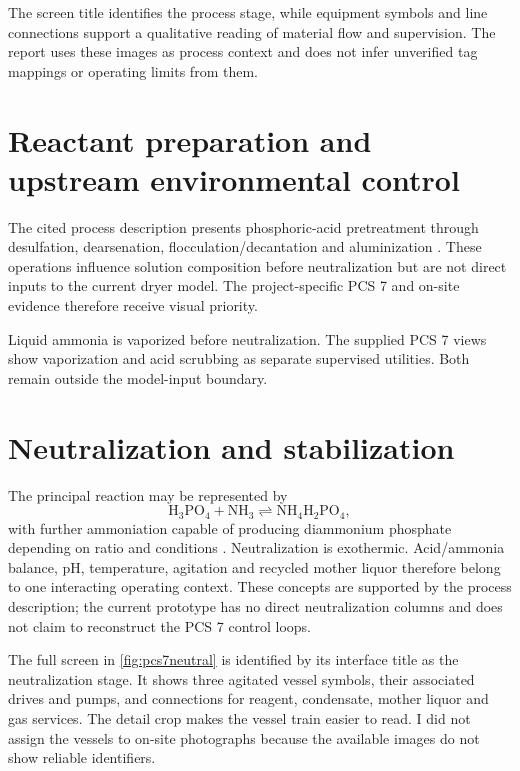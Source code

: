 \begin{engineeringbox}
The screen title identifies the process stage, while equipment symbols and line connections support a qualitative reading of material flow and supervision. The report uses these images as process context and does not infer unverified tag mappings or operating limits from them.
\end{engineeringbox}

\section{Reactant preparation and upstream environmental control}

The cited process description presents phosphoric-acid pretreatment through desulfation, dearsenation, flocculation/decantation and aluminization \cite{souilmi}. These operations influence solution composition before neutralization but are not direct inputs to the current dryer model. The project-specific PCS 7 and on-site evidence therefore receive visual priority.

Liquid ammonia is vaporized before neutralization. The supplied PCS 7 views show vaporization and acid scrubbing as separate supervised utilities. Both remain outside the model-input boundary.

\section{Neutralization and stabilization}

The principal reaction may be represented by
\begin{equation}
\mathrm{H_3PO_4 + NH_3 \rightleftharpoons NH_4H_2PO_4},
\end{equation}
with further ammoniation capable of producing diammonium phosphate depending on ratio and conditions \cite{souilmi}. Neutralization is exothermic. Acid/ammonia balance, pH, temperature, agitation and recycled mother liquor therefore belong to one interacting operating context. These concepts are supported by the process description; the current prototype has no direct neutralization columns and does not claim to reconstruct the PCS 7 control loops.

The full screen in \cref{fig:pcs7neutral} is identified by its interface title as the neutralization stage. It shows three agitated vessel symbols, their associated drives and pumps, and connections for reagent, condensate, mother liquor and gas services. The detail crop makes the vessel train easier to read. I did not assign the vessels to on-site photographs because the available images do not show reliable identifiers.

